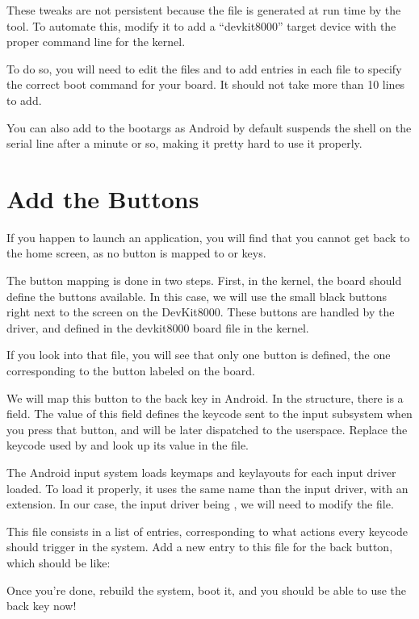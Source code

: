 These tweaks are not persistent because the  file is generated at run
time by the  tool. To automate this, modify it to add
a ``devkit8000'' target device with the proper command line for the kernel.

To do so, you will need to edit the files
 and
 to add  entries in each
file to specify the correct boot command for your board. It should not take more than 10 lines to
add.

You can also add  to the bootargs as Android by
default suspends the shell on the serial line after a minute or so, making it pretty
hard to use it properly.

\section{Add the Buttons}

If you happen to launch an application, you will find that you cannot
get back to the home screen, as no button is mapped to  or 
keys.

The button mapping is done in two steps. First, in the kernel, the
board should define the buttons available. In this case, we will use
the small black buttons right next to the screen on the
DevKit8000. These buttons are handled by the  driver,
and defined in the devkit8000 board file in the kernel.

If you look into that file, you will see that only one button is
defined, the one corresponding to the button labeled 
on the board.

We will map this button to the back key in Android. In the
 structure, there is a  field. The
value of this field defines the keycode sent to the input
subsystem when you press that button, and will be later dispatched to
the userspace. Replace the keycode used by  and look up
its value in the  file.

The Android input system loads keymaps and keylayouts for each input
driver loaded. To load it properly, it uses the same name than the
input driver, with an extension. In our case, the input driver being
, we will need to modify the  file.

This file consists in a list of entries, corresponding to what actions
every keycode should trigger in the system. Add a new entry to this file
for the back button, which should be like:

Once you're done, rebuild the system, boot it, and you should be able
to use the back key now!
